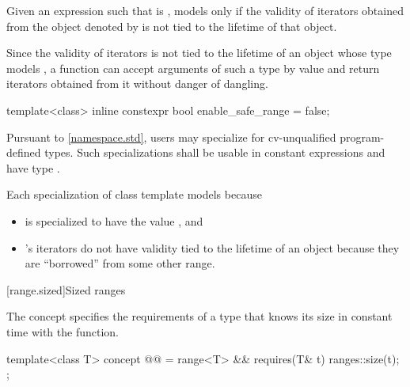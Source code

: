 \begin{itemdescr}
\pnum
Given an expression  such that  is ,
 models  only if
the validity of iterators obtained from the object denoted by 
is not tied to the lifetime of that object.

\pnum
\begin{note}
Since the validity of iterators is not tied to the lifetime of
an object whose type models ,
a function can accept arguments of such a type by value and
return iterators obtained from it without danger of dangling.
\end{note}
\end{itemdescr}

%
\begin{itemdecl}
template<class>
  inline constexpr bool enable_safe_range = false;
\end{itemdecl}

\begin{itemdescr}
\pnum
\remarks
Pursuant to \ref{namespace.std}, users may specialize 
for cv-unqualified program-defined types.
Such specializations shall be
usable in constant expressions and
have type .

\pnum
\begin{example}
Each specialization  of class template 
models  because
\begin{itemize}
\item
{} is specialized
to have the value , and

\item
{}'s iterators
do not have validity tied to the lifetime of an  object
because they are ``borrowed'' from some other range.
\end{itemize}
\end{example}
\end{itemdescr}

[range.sized]{Sized ranges}

\pnum
The  concept specifies the requirements
of a  type that knows its size in constant time with the
 function.

\begin{itemdecl}
template<class T>
  concept @@ =
    range<T> &&
    requires(T& t) { ranges::size(t); };
\end{itemdecl}

